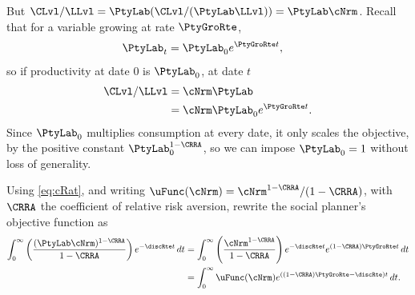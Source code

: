 \documentclass{econark}
\begin{document}
But $\CLvl/\LLvl = \PtyLab (\CLvl/(\PtyLab \LLvl))= \PtyLab \cNrm$.  Recall that for a variable growing at rate $\PtyGroRte$,
\begin{equation}\begin{gathered}\begin{aligned}
  \PtyLab _{t} & =  \PtyLab _{0}e^{\PtyGroRte t} ,
\end{aligned}\end{gathered}\end{equation}
so if productivity at date 0 is $\PtyLab_{0}$, at date $t$
\begin{equation}\begin{gathered}\begin{aligned}
  \CLvl/\LLvl & =  \cNrm\PtyLab   \\
               & =  \cNrm\PtyLab _{0}e^{\PtyGroRte t}. \label{eq:cRat}
\end{aligned}\end{gathered}\end{equation}
Since $\PtyLab_{0}$ multiplies consumption at every date, it only scales the objective, by the positive constant $\PtyLab_{0}^{1-\CRRA}$, so we can impose $\PtyLab_{0}=1$ without loss of generality.

Using \eqref{eq:cRat}, and writing $\uFunc(\cNrm) = \cNrm^{1-\CRRA}/(1-\CRRA)$, with $\CRRA$ the coefficient of relative risk aversion, rewrite the social planner's objective function as
\begin{equation}\begin{gathered}\begin{aligned}
  \int_{0}^{\infty} \left(\frac{(\PtyLab \cNrm)^{1-\CRRA}}{1-\CRRA}\right) e^{-\discRte  t}\,dt & =
  \int_{0}^{\infty} \left(\frac{\cNrm^{1-\CRRA}}{1-\CRRA}\right) e^{-\discRte  t}e^{(1-\CRRA)\PtyGroRte  t}\,dt
  \\ & =  \int_{0}^{\infty} \uFunc(\cNrm) e^{\left((1-\CRRA)\PtyGroRte -\discRte \right) t}\,dt
           .
           \label{eq:maxprobmod}
\end{aligned}\end{gathered}\end{equation}
\end{document}
